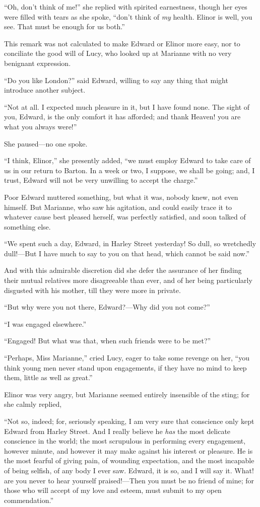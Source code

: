 ``Oh, don't think of me!'' she replied with spirited
earnestness, though her eyes were filled with tears
as she spoke, ``don't think of \emph{my} health.  Elinor is well,
you see.  That must be enough for us both.''

This remark was not calculated to make Edward or
Elinor more easy, nor to conciliate the good will of Lucy,
who looked up at Marianne with no very benignant expression.

``Do you like London?'' said Edward, willing to say
any thing that might introduce another subject.

``Not at all.  I expected much pleasure in it,
but I have found none.  The sight of you, Edward, is the
only comfort it has afforded; and thank Heaven! you
are what you always were!''

She paused---no one spoke.

``I think, Elinor,'' she presently added, ``we must
employ Edward to take care of us in our return to Barton.
In a week or two, I suppose, we shall be going; and, I trust,
Edward will not be very unwilling to accept the charge.''

Poor Edward muttered something, but what it was,
nobody knew, not even himself.  But Marianne, who saw
his agitation, and could easily trace it to whatever
cause best pleased herself, was perfectly satisfied,
and soon talked of something else.

``We spent such a day, Edward, in Harley Street
yesterday!  So dull, so wretchedly dull!---But I have much
to say to you on that head, which cannot be said now.''

And with this admirable discretion did she defer
the assurance of her finding their mutual relatives more
disagreeable than ever, and of her being particularly
disgusted with his mother, till they were more in private.

``But why were you not there, Edward?---Why did you
not come?''

``I was engaged elsewhere.''

``Engaged!  But what was that, when such friends
were to be met?''

``Perhaps, Miss Marianne,'' cried Lucy, eager to take
some revenge on her, ``you think young men never stand
upon engagements, if they have no mind to keep them,
little as well as great.''

Elinor was very angry, but Marianne seemed entirely
insensible of the sting; for she calmly replied,

``Not so, indeed; for, seriously speaking, I am very
sure that conscience only kept Edward from Harley Street.
And I really believe he \emph{has} the most delicate conscience
in the world; the most scrupulous in performing
every engagement, however minute, and however it
may make against his interest or pleasure.  He is the
most fearful of giving pain, of wounding expectation,
and the most incapable of being selfish, of any body
I ever saw.  Edward, it is so, and I will say it.
What! are you never to hear yourself praised!---Then you
must be no friend of mine; for those who will accept
of my love and esteem, must submit to my open commendation.''

